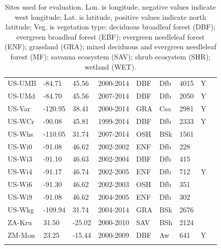 \documentclass{myreport}
\begin{document}
\begin{longtable}{lllllllll}
  US-UMB & -84.71 & 45.56 & 2000-2014 & DBF & Dfb & 4015 & Y & \cite{US-UMB} \\ 
  US-UMd & -84.70 & 45.56 & 2007-2014 & DBF & Dfb & 2050 & Y & \cite{US-UMd} \\ 
  US-Var & -120.95 & 38.41 & 2000-2014 & GRA & Csa & 2981 & Y & \cite{US-Var} \\ 
  US-WCr & -90.08 & 45.81 & 1999-2014 & DBF & Dfb & 2333 & Y & \cite{US-WCr} \\ 
  US-Whs & -110.05 & 31.74 & 2007-2014 & OSH & BSk & 1561 &  & \cite{US-Whs} \\ 
  US-Wi0 & -91.08 & 46.62 & 2002-2002 & ENF & Dfb & 228 &  & \cite{US-Wi0} \\ 
  US-Wi3 & -91.10 & 46.63 & 2002-2004 & DBF & Dfb & 415 &  & \cite{US-Wi3} \\ 
  US-Wi4 & -91.17 & 46.74 & 2002-2005 & ENF & Dfb & 712 & Y & \cite{US-Wi4} \\ 
  US-Wi6 & -91.30 & 46.62 & 2002-2003 & OSH & Dfb & 351 &  & \cite{US-Wi6} \\ 
  US-Wi9 & -91.08 & 46.62 & 2004-2005 & ENF & Dfb & 302 &  & \cite{US-Wi9} \\ 
  US-Wkg & -109.94 & 31.74 & 2004-2014 & GRA & BSk & 2676 &  & \cite{US-Wkg} \\ 
  ZA-Kru & 31.50 & -25.02 & 2000-2010 & SAV & BSh & 2124 &  & \cite{ZA-Kru} \\ 
  ZM-Mon & 23.25 & -15.44 & 2000-2009 & DBF & Aw & 641 & Y & \cite{ZM-Mon} \\ 
  \bottomrule
\caption{Sites used for evaluation. Lon. is longitude, negative values indicate west longitude; Lat. is latitude, positive values indicate north latitude; Veg. is vegetation type: deciduous broadleaf forest (DBF); evergreen broadleaf forest (EBF); evergreen needleleaf forest (ENF); grassland (GRA); mixed deciduous and evergreen needleleaf forest (MF); savanna ecosystem (SAV); shrub ecosystem (SHR); wetland (WET).} 
\label{tab:sites}
\end{longtable}
\end{document}
